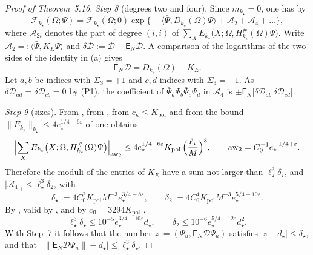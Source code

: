 \documentclass[11pt,letterpaper,reqno]{amsart}
\theoremstyle{definition}
\begin{document}
\begin{proof}[Proof of Theorem~5.16]
\emph{Step 8} (degrees two and four).
Since $m_{k_\star}=0$, one has by \cite{QEDIII}
\begin{equation*}
\mathscr F_{k_\star}(\Omega;\Psi)=\mathscr F_{k_\star}(\Omega;0)\exp\bigl\{-\langle\bar\Psi,D_{k_\star}(\Omega)\Psi\rangle+\mathcal A_2+\mathcal A_4+\dots\bigr\},
\end{equation*}
where $\mathcal A_{2i}$ denotes the part of degree $(i,i)$ of $\sum_XE_{k_\star}\bigl(X;\Omega,H^\#_{k_\star}(\Omega)\Psi\bigr)$.
Write $\mathcal A_2=:\langle\bar\Psi,K_E\Psi\rangle$ and $\delta\mathcal D:=\mathcal D-\mathsf E_N\mathcal D$.
A comparison of the logarithms of the two sides of the identity in (a) gives
\begin{equation*}
\mathsf E_N\mathcal D=D_{k_\star}(\Omega)-K_E .
\end{equation*}
Let $a,b$ be indices with $\Sigma_3=+1$ and $c,d$ indices with $\Sigma_3=-1$.
As $\delta\mathcal D_{ad}=\delta\mathcal D_{cb}=0$ by (P1), the coefficient of $\bar\Psi_a\Psi_b\bar\Psi_c\Psi_d$ in $\mathcal A_4$ is $\pm\mathsf E_N\bigl[\delta\mathcal D_{ab}\,\allowbreak \delta\mathcal D_{cd}\bigr]$.

\emph{Step 9} (sizes).
From \cite[Proposition~20.1\,(c)]{QEDIII}, from \cite[(k6)]{QEDIII}, from $c_\kappa\le K_{\mathrm{pol}}$ \cite{QEDIII} and from the bound $\|E_{k_\star}\|_{k_\star}\le4e_\star^{1/4-6\varepsilon}$ of \cite[Proposition~28.3\,(b)]{QEDIII} one obtains
\begin{equation*}
\Bigl|\sum_XE_{k_\star}\bigl(X;\Omega,H^\#_{k_\star}(\Omega)\Psi\bigr)\Bigr|_{\mathrm{aw}_2}\le4e_\star^{1/4-6\varepsilon}K_{\mathrm{pol}}\,\Bigl(\frac{\ell_\star}{M}\Bigr)^3,\qquad\mathrm{aw}_2=C_0^{-1}e_\star^{-1/4+\varepsilon}.
\end{equation*}
Therefore the moduli of the entries of $K_E$ have a sum not larger than $\ell_\star^3\delta_\star$, and $|\mathcal A_4|_1\le\ell_\star^3\delta_2$, with
\begin{equation*}
\delta_\star:=4C_0^2K_{\mathrm{pol}}M^{-3}e_\star^{3/4-8\varepsilon},\qquad\delta_2:=4C_0^4K_{\mathrm{pol}}M^{-3}e_\star^{5/4-10\varepsilon}.
\end{equation*}
By \cite[(T2)]{QEDIII}, valid by \cite[(Sc6)]{QEDIII}, and by $c_{\mathrm{fl}}=3294K_{\mathrm{pol}}$ \cite{QEDIII},
\begin{equation*}
\ell_\star^3\delta_\star\le10^{-5}e_\star^{3/4-10\varepsilon}d_\star,\qquad\delta_2\le10^{-6}e_\star^{5/4-12\varepsilon}d_\star^2 .
\end{equation*}
With Step~7 it follows that the number $\bar z:=(\Psi_u,\mathsf E_N\mathcal D\Psi_u)$ satisfies $|\bar z-d_\star|\le\delta_\star$, and that $\bigl|\,\allowbreak \|\mathsf E_N\mathcal D\Psi_u\|-d_\star\bigr|\le\ell_\star^3\delta_\star$.


\end{proof}
\end{document}
